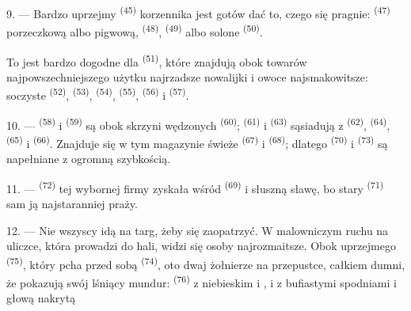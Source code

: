 9. --- Bardzo uprzejmy  \textsuperscript{(45)} korzennika jest gotów
dać to, czego się pragnie:  \textsuperscript{(47)} porzeczkową albo
pigwową,  \textsuperscript{(48)}, 
\textsuperscript{(49)} albo solone  \textsuperscript{(50)}.

To jest bardzo dogodne dla  \textsuperscript{(51)}, które znajdują obok
towarów najpowszechniejszego użytku najrzadsze nowalijki i owoce najsmakowitsze:
soczyste  \textsuperscript{(52)},  \textsuperscript{(53)},
 \textsuperscript{(54)},  \textsuperscript{(55)},
 \textsuperscript{(56)} i  \textsuperscript{(57)}.

\VUsaut{4.0mm}
\VUsaut{3.0mm}

10. ---  \textsuperscript{(58)} i  \textsuperscript{(59)}
są obok skrzyni wędzonych  \textsuperscript{(60)}; 
\textsuperscript{(61)} i  \textsuperscript{(63)} sąsiadują z
 \textsuperscript{(62)},  \textsuperscript{(64)},
 \textsuperscript{(65)} i 
\textsuperscript{(66)}. Znajduje się w tym magazynie świeże 
\textsuperscript{(67)} i  \textsuperscript{(68)}; dlatego 
\textsuperscript{(70)} i  \textsuperscript{(73)} są napełniane
z ogromną szybkością.

11. ---  \textsuperscript{(72)} tej wybornej firmy zyskała wśród
 \textsuperscript{(69)} i  słuszną sławę, bo stary
 \textsuperscript{(71)} sam ją najstaranniej praży.

\VUsaut{4.0mm}
\VUsaut{3.0mm}

12. --- Nie wszyscy idą na targ, żeby się zaopatrzyć. W malowniczym ruchu na uliczce,
która prowadzi do hali, widzi się osoby najrozmaitsze. Obok uprzejmego  \textsuperscript{(75)}, który pcha przed sobą 
\textsuperscript{(74)}, oto dwaj żołnierze na przepustce, całkiem dumni, że pokazują
swój lśniący mundur:  \textsuperscript{(76)} z niebieskim
 i , i  z
bufiastymi spodniami i głową nakrytą 

